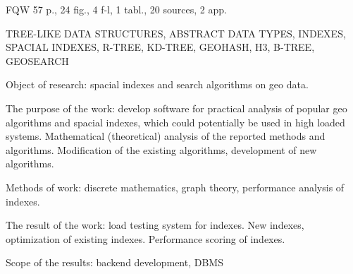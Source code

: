 
FQW 57 p., 24 fig., 4 f-l, 1 tabl., 20 sources, 2 app.

\noindent TREE-LIKE DATA STRUCTURES, ABSTRACT DATA TYPES, INDEXES, SPACIAL INDEXES, R-TREE, KD-TREE, GEOHASH, H3, B-TREE, GEOSEARCH


Object of research: spacial indexes and search algorithms on geo data.

The purpose of the work: develop software for practical analysis of popular geo algorithms and spacial indexes, which could potentially be used in high loaded systems. Mathematical (theoretical) analysis of the reported methods and algorithms. Modification of the existing algorithms, development of new algorithms. 

Methods of work: discrete mathematics, graph theory, performance analysis of indexes.

The result of the work: load testing system for indexes. New indexes, optimization of existing indexes. Performance scoring of indexes.

Scope of the results: backend development, DBMS



